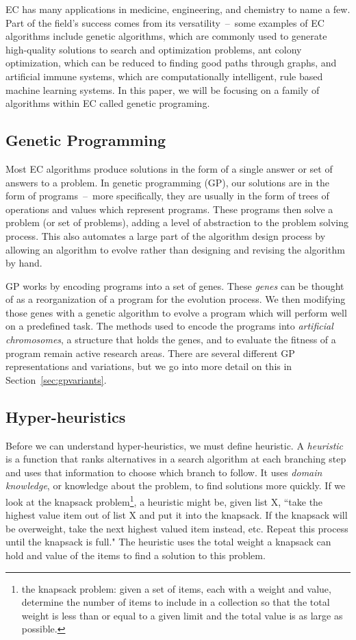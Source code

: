 \documentclass{sig-alternate}
\begin{document}
EC has many applications in medicine, engineering, and chemistry to name a few. Part of the field's success comes from its versatility~--~some examples of EC algorithms include genetic algorithms, which are commonly used to generate high-quality solutions to search and optimization problems, ant colony optimization, which can be reduced to finding good paths through graphs, and artificial immune systems, which are computationally intelligent, rule based machine learning systems. In this paper, we will be focusing on a family of algorithms within EC called genetic programing.

\subsection{Genetic Programming}
\label{sec:GP}
Most EC algorithms produce solutions in the form of a single answer or set of answers to a problem. In genetic programming (GP), our solutions are in the form of programs~--~more specifically, they are usually in the form of trees of operations and values which represent programs. These programs then solve a problem (or set of problems), adding a level of abstraction to the problem solving process. This also automates a large part of the algorithm design process by allowing an algorithm to evolve rather than designing and revising the algorithm by hand.

GP works by encoding programs into a set of genes. These \textit{genes} can be thought of as a reorganization of a program for the evolution process. We then modifying those genes with a genetic algorithm to evolve a program which will perform well on a predefined task. The methods used to encode the programs into \textit{artificial chromosomes}, a structure that holds the genes, and to evaluate the fitness of a program remain active research areas. There are several different GP representations and variations, but we go into more detail on this in Section~\ref{sec:gpvariants}.

\subsection{Hyper-heuristics}
\label{sec:HH}
Before we can understand hyper-heuristics, we must define heuristic. A \textit{heuristic} is a function that ranks alternatives in a search algorithm at each branching step and uses that information to choose which branch to follow. It uses \textit{domain knowledge}, or knowledge about the problem, to find solutions more quickly. If we look at the knapsack problem\footnote{the knapsack problem: given a set of items, each with a weight and value, determine the number of items to include in a collection so that the total weight is less than or equal to a given limit and the total value is as large as possible.}, a heuristic might be, given list X, ``take the highest value item out of list X and put it into the knapsack. If the knapsack will be overweight, take the next highest valued item instead, etc. Repeat this process until the knapsack is full." The heuristic uses the total weight a knapsack can hold and value of the items to find a solution to this problem.
\end{document}
